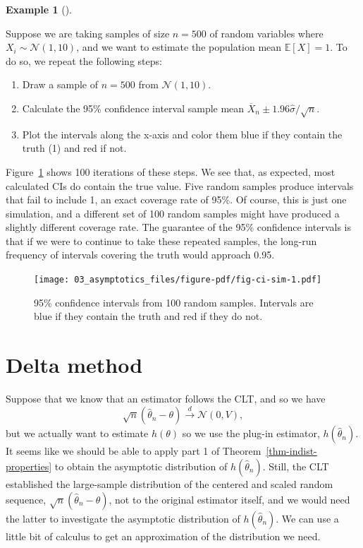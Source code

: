\documentclass[
  letterpaper,
  DIV=11,
  numbers=noendperiod]{scrreprt}
\providecommand{\tightlist}{%
  \setlength{\itemsep}{0pt}\setlength{\parskip}{0pt}}\usepackage{longtable,booktabs,array}
\newcommand{\E}{\mathbb{E}}
\newcommand{\N}{\mathcal{N}}
\newcommand{\Xbar}{\overline{X}}
\newcommand{\indist}{\overset{d}{\to}}
\theoremstyle{plain}
\theoremstyle{definition}
\newtheorem{example}{Example}[chapter]
\theoremstyle{definition}
\theoremstyle{remark}
\begin{document}
\begin{example}[]\protect\hypertarget{exm-cis}{}\label{exm-cis}

Suppose we are taking samples of size \(n=500\) of random variables
where \(X_i \sim \N(1, 10)\), and we want to estimate the population
mean \(\E[X] = 1\). To do so, we repeat the following steps:

\begin{enumerate}
\def\labelenumi{\arabic{enumi}.}
\tightlist
\item
  Draw a sample of \(n=500\) from \(\N(1, 10)\).
\item
  Calculate the 95\% confidence interval sample mean
  \(\Xbar_n \pm 1.96\widehat{\sigma}/\sqrt{n}\).
\item
  Plot the intervals along the x-axis and color them blue if they
  contain the truth (1) and red if not.
\end{enumerate}

Figure~\ref{fig-ci-sim} shows 100 iterations of these steps. We see
that, as expected, most calculated CIs do contain the true value. Five
random samples produce intervals that fail to include 1, an exact
coverage rate of 95\%. Of course, this is just one simulation, and a
different set of 100 random samples might have produced a slightly
different coverage rate. The guarantee of the 95\% confidence intervals
is that if we were to continue to take these repeated samples, the
long-run frequency of intervals covering the truth would approach 0.95.

\begin{figure}[th]

{\centering \texttt{[image: 03\_asymptotics\_files/figure-pdf/fig-ci-sim-1.pdf]}

}

\caption{\label{fig-ci-sim}95\% confidence intervals from 100 random
samples. Intervals are blue if they contain the truth and red if they do
not.}

\end{figure}

\end{example}

\hypertarget{sec-delta-method}{%
\section{Delta method}\label{sec-delta-method}}

Suppose that we know that an estimator follows the CLT, and so we have
\[
\sqrt{n}\left(\widehat{\theta}_n - \theta \right) \indist \N(0, V),
\] but we actually want to estimate \(h(\theta)\) so we use the plug-in
estimator, \(h(\widehat{\theta}_n)\). It seems like we should be able to
apply part 1 of Theorem~\ref{thm-indist-properties} to obtain the
asymptotic distribution of \(h(\widehat{\theta}_n)\). Still, the CLT
established the large-sample distribution of the centered and scaled
random sequence, \(\sqrt{n}(\widehat{\theta}_n - \theta)\), not to the
original estimator itself, and we would need the latter to investigate
the asymptotic distribution of \(h(\widehat{\theta}_n)\). We can use a
little bit of calculus to get an approximation of the distribution we
need.
\end{document}

